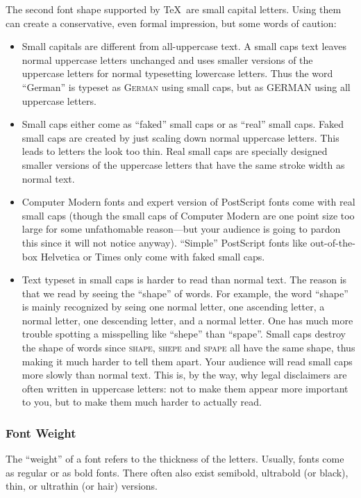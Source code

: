 The second font shape supported by \TeX\ are small capital letters. Using them can create a conservative, even formal impression, but some words of caution:
\begin{itemize}
\item
  Small capitals are different from all-uppercase text. A small caps text leaves normal uppercase letters unchanged and uses smaller versions of the uppercase letters for normal typesetting lowercase letters. Thus the word ``German'' is typeset as \textsc{German} using small caps, but as \uppercase{German} using all uppercase letters.
\item
  Small caps either come as ``faked'' small caps or as ``real'' small caps. Faked small caps are created by just scaling down normal uppercase letters. This leads to letters the look too thin. Real small caps are specially designed smaller versions of the uppercase letters that have the same stroke width as normal text.
\item
  Computer Modern fonts and expert version of PostScript fonts come with real small caps (though the small caps of Computer Modern are one point size too large for some unfathomable reason---but your audience is going to pardon this since it will not notice anyway). ``Simple'' PostScript fonts like out-of-the-box Helvetica or Times only come with faked small caps.
\item
  Text typeset in small caps is harder to read than normal text. The reason is that we read by seeing the ``shape'' of words. For example, the word ``shape'' is mainly recognized by seing one normal letter, one ascending letter, a normal letter, one descending letter, and a normal letter. One has much more trouble spotting a misspelling like ``shepe''  than ``spape''. Small caps destroy the shape of words since \textsc{shape}, \textsc{shepe} and \textsc{spape} all have the same shape, thus making it much harder to tell them apart. Your audience will read small caps more slowly than normal text. This is, by the way, why legal disclaimers are often written in uppercase letters: not to make them appear more important to you, but to make them much harder to actually read.
\end{itemize}

\subsubsection{Font Weight}

The ``weight'' of a font refers to the thickness of the letters. Usually, fonts come as regular or as bold fonts. There often also exist semibold, ultrabold (or black), thin, or ultrathin (or hair) versions.

